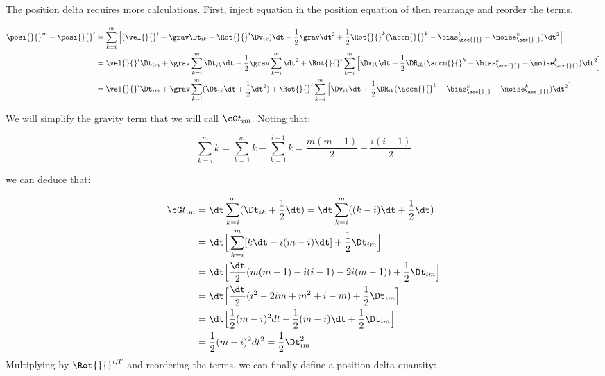 The position delta requires more calculations. First, inject equation  in the position equation of  then rearrange and reorder the terms.

\begin{equation}
\begin{split}
\posi{}{}^{m} - \posi{}{}^{i} &= \sum_{k=i}^{m} \Big[
(\vel{}{}^i + \grav \Dt_{ik} + \Rot{}{}^i \Dv_{ik})\dt 
+ \frac{1}{2}\grav \dt^2 + \frac{1}{2}\Rot{}{}^{k}(\accm{}{}^k - \bias_{\acc{}{}}^k - \noise_{\acc{}{}}^k)\dt^2 \Big]
\\
&= \vel{}{}^i \Dt_{im} + 
\grav\sum_{k=i}^{m} \Dt_{ik} \dt + \frac{1}{2}\grav \sum_{k=i}^{m} \dt^2 +
\Rot{}{}^i\sum_{k=i}^{m} \Big[\Dv_{ik}\dt +  \frac{1}{2} \DR_{ik} (\accm{}{}^k - \bias_{\acc{}{}}^k - \noise_{\acc{}{}}^k)\dt^2 \Big]
\\
&= \vel{}{}^i \Dt_{im} + 
\grav \sum_{k=i}^{m} (\Dt_{ik} \dt + \frac{1}{2}\dt^2) +
\Rot{}{}^i\sum_{k=i}^{m} \Big[\Dv_{ik}\dt +  \frac{1}{2} \DR_{ik} (\accm{}{}^k - \bias_{\acc{}{}}^k - \noise_{\acc{}{}}^k)\dt^2 \Big]
\end{split}
\end{equation}

We will simplify the gravity term that we will call $\cG t_{im}$. Noting that:

\begin{equation*}
    \sum_{k=i}^{m}k = \sum_{k=1}^{m}k - \sum_{k=1}^{i-1}k = \frac{m(m-1)}{2} - \frac{i(i-1)}{2} 
\end{equation*}

we can deduce that:

\begin{equation*}
\begin{split}
\cG t_{im} 
&= \dt \sum_{k=i}^{m}(\Dt_{ik} + \frac{1}{2}\dt) = \dt \sum_{k=i}^{m}((k -i)\dt + \frac{1}{2}\dt)
\\
&= \dt \Big[ \sum_{k=i}^{m} [ k \dt - i(m-i)\dt ] + \frac{1}{2}\Dt_{im}  \Big] 
\\
&= \dt \Big[ \frac{\dt}{2} (m(m-1) - i(i-1) - 2i(m-1)) + \frac{1}{2}\Dt_{im} \Big] 
\\
&= \dt \Big[ \frac{\dt}{2} (i^2 - 2im + m^2 + i - m) + \frac{1}{2}\Dt_{im} \Big] 
\\
&= \dt \Big[ \frac{1}{2} (m-i)^2dt - \frac{1}{2}(m - i)\dt + \frac{1}{2}\Dt_{im} \Big]
\\
&= \frac{1}{2} (m-i)^2dt^2 = \frac{1}{2} \Dt_{im}^2
\end{split}
\end{equation*}
Multiplying by $\Rot{}{}^{i,T}$ and reordering the terms, we can finally define a position delta quantity:

